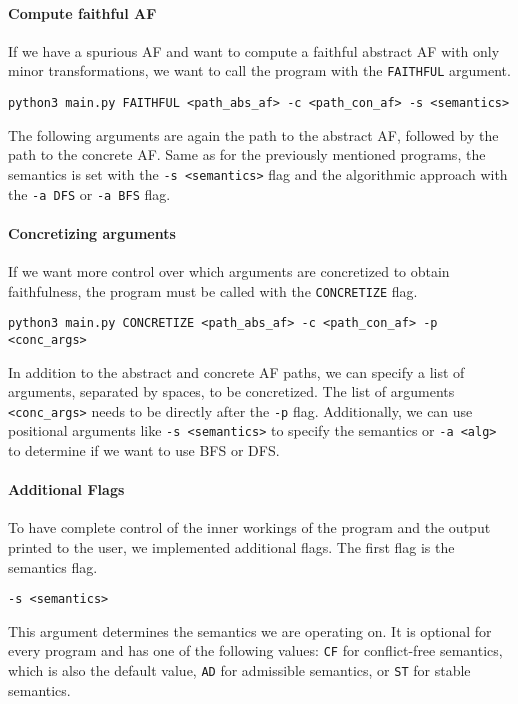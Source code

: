 \paragraph{Compute faithful AF} If we have a spurious AF and want to compute a faithful abstract AF with only minor transformations, we want to call the program with the \texttt{FAITHFUL} argument.

\begin{center}
    \texttt{python3 main.py FAITHFUL <path\_abs\_af> -c <path\_con\_af> -s <semantics>}
\end{center}

The following arguments are again the path to the abstract AF, followed by the path to the concrete AF. Same as for the previously mentioned programs, the semantics is set with the \texttt{-s <semantics>} flag and the algorithmic approach with the \texttt{-a DFS} or \texttt{-a BFS} flag.

\paragraph{Concretizing arguments} If we want more control over which arguments are concretized to obtain faithfulness, the program must be called with the \texttt{CONCRETIZE} flag.

\begin{center}
    \texttt{python3 main.py CONCRETIZE <path\_abs\_af> -c <path\_con\_af> -p <conc\_args>}
\end{center}

In addition to the abstract and concrete AF paths, we can specify a list of arguments, separated by spaces, to be concretized. The list of arguments \texttt{<conc\_args>} needs to be directly after the \texttt{-p} flag. Additionally, we can use positional arguments like \texttt{-s <semantics>} to specify the semantics or \texttt{-a <alg>} to determine if we want to use BFS or DFS.

\paragraph{Additional Flags} To have complete control of the inner workings of the program and the output printed to the user, we implemented additional flags. The first flag is the semantics flag.

\begin{center}
    \texttt{-s <semantics>}
\end{center}

This argument determines the semantics we are operating on. It is optional for every program and has one of the following values: \texttt{CF} for conflict-free semantics, which is also the default value, \texttt{AD} for admissible semantics, or \texttt{ST} for stable semantics. 

